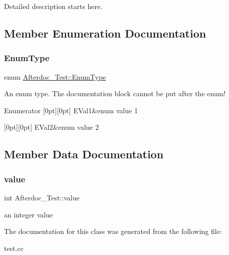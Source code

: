 Detailed description starts here. 

\subsection{Member Enumeration Documentation}
\mbox{\label{classAfterdoc__Test_adab0cd7ad3b4875e245ca8f6238a388a}} 
\subsubsection{\texorpdfstring{EnumType}{EnumType}}
{\footnotesize\ttfamily enum \mbox{\hyperlink{classAfterdoc__Test_adab0cd7ad3b4875e245ca8f6238a388a}{Afterdoc\+\_\+\+Test\+::\+Enum\+Type}}}

An enum type. The documentation block cannot be put after the enum! \begin{DoxyEnumFields}{Enumerator}
[0pt][0pt]{}\mbox{\label{classAfterdoc__Test_adab0cd7ad3b4875e245ca8f6238a388aae054276790e35692ad0abe10c5b75da4}} 
E\+Val1&enum value 1 \\
\hline

[0pt][0pt]{}\mbox{\label{classAfterdoc__Test_adab0cd7ad3b4875e245ca8f6238a388aac849f37624d8d2d68ca72c4a8df9cf99}} 
E\+Val2&enum value 2 \\
\hline

\end{DoxyEnumFields}


\subsection{Member Data Documentation}
\mbox{\label{classAfterdoc__Test_a9287a08830e5cdfd9c732bb7932694a0}} 
\subsubsection{\texorpdfstring{value}{value}}
{\footnotesize\ttfamily int Afterdoc\+\_\+\+Test\+::value}

an integer value 

The documentation for this class was generated from the following file\+:\begin{DoxyCompactItemize}
\item 
test.\+cc\end{DoxyCompactItemize}
